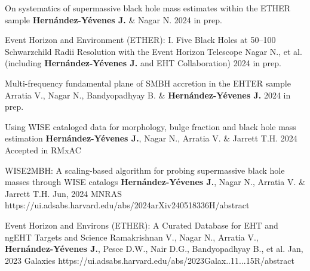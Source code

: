 
\begin{cvpublications}{}

	 {On systematics of supermassive black hole mass estimates within the ETHER sample}
	 {\textbf{Hernández-Yévenes J.} \& Nagar N.}
	 {2024}
     {in prep.}
     {}

	 {Event Horizon and Environment (ETHER): I. Five Black Holes at 50–100 Schwarzchild Radii Resolution with the Event Horizon Telescope}
	 {Nagar N., et al. (including \textbf{Hernández-Yévenes J.} and EHT Collaboration)}
	 {2024}
     {in prep.}
     {}

	 {Multi-frequency fundamental plane of SMBH accretion in the EHTER sample}
	 {Arratia V., Nagar N., Bandyopadhyay B. \& \textbf{Hernández-Yévenes J.}}
	 {2024}
     {in prep.}
     {}
     
	 {Using WISE cataloged data for morphology, bulge fraction and black hole mass estimation}
	 {\textbf{Hernández-Yévenes J.}, Nagar N., Arratia V. \& Jarrett T.H.}
	 {2024}
     {Accepted in RMxAC}
     {}
     
	 {WISE2MBH: A scaling-based algorithm for probing supermassive black hole masses through WISE catalogs}
	 {\textbf{Hernández-Yévenes J.}, Nagar N., Arratia V. \& Jarrett T.H.}
	 {Jun, 2024}
     {MNRAS}
     {https://ui.adsabs.harvard.edu/abs/2024arXiv240518336H/abstract}

	{Event Horizon and Environs (ETHER): A Curated Database for EHT and ngEHT Targets and Science}
	{Ramakrishnan V., Nagar N., Arratia V., \textbf{Hernández-Yévenes J.}, Pesce D.W., Nair D.G., Bandyopadhyay B., et al.}
    {Jan, 2023}
	{Galaxies}
    {https://ui.adsabs.harvard.edu/abs/2023Galax..11...15R/abstract}

\end{cvpublications}
